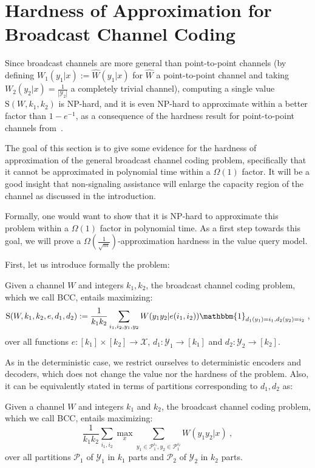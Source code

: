 \section{Hardness of Approximation for Broadcast Channel Coding}
\label{section:HardnessBC}
Since broadcast channels are more general than point-to-point channels (by defining $W_1(y_1|x):=\hat{W}(y_1|x)$ for $\hat{W}$ a point-to-point channel and taking $W_2(y_2|x)=\frac{1}{|\mathcal{Y}_2|}$ a completely trivial channel), computing a single value $\mathrm{S}(W,k_1,k_2)$ is \textrm{NP}-hard, and it is even \textrm{NP}-hard to approximate within a better factor than $1-e^{-1}$, as a consequence of the hardness result for point-to-point channels from~\cite{BF18}.

The goal of this section is to give some evidence for the hardness of approximation of the general broadcast channel coding problem, specifically that it cannot be approximated in polynomial time within a $\Omega(1)$ factor. It will be a good insight that non-signaling assistance will enlarge the capacity region of the channel as discussed in the introduction.

Formally, one would want to show that it is \textrm{NP}-hard to approximate this problem within a $\Omega(1)$ factor in polynomial time. As a first step towards this goal, we will prove a $\Omega\left(\frac{1}{\sqrt{m}}\right)$-approximation hardness in the value query model.

First, let us introduce formally the problem:
\begin{definition}
  Given a channel $W$ and integers $k_1,k_2$, the broadcast channel coding problem, which we call \textsc{BCC}, entails maximizing:
  \[ \mathrm{S}(W,k_1,k_2,e,d_1,d_2) := \frac{1}{k_1k_2}\sum_{i_1,i_2,y_1,y_2} W(y_1y_2|e(i_1,i_2))\mathbbm{1}_{d_1(y_1)=i_1, d_2(y_2)=i_2} \ ,\]
  over all functions $e : [k_1] \times [k_2] \rightarrow \mathcal{X}$, $d_1 : \mathcal{Y}_1 \rightarrow [k_1]$ and $d_2 : \mathcal{Y}_2 \rightarrow [k_2]$.
\end{definition}

As in the deterministic case, we restrict ourselves to deterministic encoders and decoders, which does not change the value nor the hardness of the problem. Also, it can be equivalently stated in terms of partitions corresponding to $d_1,d_2$ as:
\begin{proposition}
  Given a channel $W$ and integers $k_1$ and $k_2$, the broadcast channel coding problem, which we call \textsc{BCC}, entails maximizing:
  \[ \frac{1}{k_1k_2}\sum_{i_1,i_2} \max_x \sum_{y_1 \in \mathcal{P}_1^{i_1}, y_2 \in \mathcal{P}_1^{i_2}} W(y_1y_2|x) \ , \]
  over all partitions $\mathcal{P}_1$ of $\mathcal{Y}_1$ in $k_1$ parts and $\mathcal{P}_2$ of $\mathcal{Y}_2$ in $k_2$ parts.
\end{proposition}


